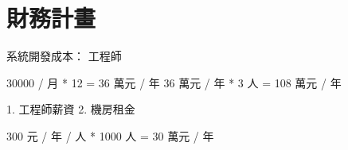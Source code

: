 \section{財務計畫}


系統開發成本： 工程師

30000 / 月 * 12 = 36 萬元 / 年
36 萬元 / 年 * 3 人 = 108 萬元 / 年

1. 工程師薪資
2. 機房租金



300 元 / 年 / 人 * 1000 人 = 30 萬元 / 年